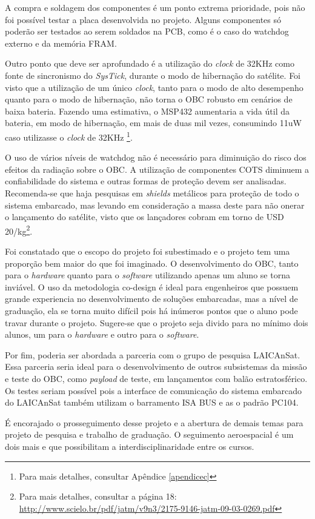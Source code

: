 A compra e soldagem dos componentes é um ponto extrema prioridade, pois não foi possível testar a placa desenvolvida no projeto. Alguns componentes só poderão ser testados ao serem soldados na PCB, como é o caso do watchdog externo e da memória FRAM.

Outro ponto que deve ser aprofundado é a utilização do \textit{clock} de 32KHz como fonte de sincronismo do \textit{SysTick}, durante o modo de hibernação do satélite. Foi visto que a utilização de um único  \textit{clock}, tanto para o modo de alto desempenho quanto para o modo de hibernação, não torna o OBC robusto em cenários de baixa bateria. Fazendo uma estimativa, o MSP432 aumentaria a vida útil da bateria, em modo de hibernação, em mais de duas mil vezes, consumindo 11uW caso utilizasse o \textit{clock} de 32KHz \footnote{Para mais detalhes, consultar Apêndice \ref{apendicec}}.

O uso de vários níveis de watchdog não é necessário para diminuição do risco dos efeitos da radiação sobre o OBC. A utilização de componentes COTS diminuem a confiabilidade do sistema e outras formas de proteção devem ser analisadas. Recomenda-se que haja pesquisas em \textit{shields} metálicos para proteção de todo o sistema embarcado,  mas levando em consideração a massa  deste para não onerar o lançamento do satélite, visto que os lançadores cobram em torno de USD 20/kg\footnote{Para mais detalhes, consultar a página 18: \url{http://www.scielo.br/pdf/jatm/v9n3/2175-9146-jatm-09-03-0269.pdf}}.

Foi constatado que o escopo do projeto foi subestimado e o projeto tem uma proporção bem maior do que foi imaginado. O desenvolvimento do OBC, tanto para o \textit{hardware} quanto para o \textit{software} utilizando apenas um aluno se torna inviável. O uso da metodologia co-design é ideal para engenheiros que possuem grande experiencia no desenvolvimento de soluções embarcadas, mas a nível de graduação, ela se torna muito difícil pois há inúmeros pontos que o aluno pode travar durante o projeto. Sugere-se que o projeto seja divido para no mínimo dois alunos, um para o \textit{hardware} e outro para o \textit{software}. 

Por fim, poderia ser abordada a parceria com o grupo de pesquisa LAICAnSat. Essa parceria seria ideal para o desenvolvimento de outros subsistemas da missão e teste do OBC, como \textit{payload} de teste, em lançamentos com balão estratosférico. Os testes seriam possível pois a interface de comunicação do sistema embarcado do LAICAnSat também utilizam o barramento ISA BUS e as o padrão PC104. 

É encorajado o prosseguimento desse projeto e a abertura de demais temas para projeto de pesquisa e trabalho de graduação. O seguimento aeroespacial é um dois mais e que possibilitam a interdisciplinaridade entre os cursos.
\FloatBarrier